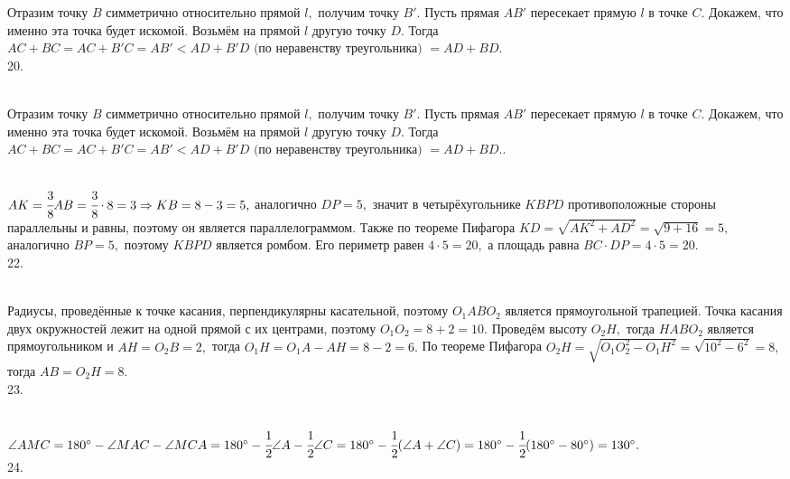 Отразим точку $B$ симметрично относительно прямой $l,$ получим точку $B'.$ Пусть прямая $AB'$ пересекает прямую $l$ в точке $C.$ Докажем, что именно эта точка будет искомой. Возьмём на прямой $l$ другую точку $D.$ Тогда $AC+BC=AC+B'C=AB'<AD+B'D\text{ (по неравенству треугольника) }=AD+BD.$\\
20. \begin{figure}[ht!]
\end{figure}\\
Отразим точку $B$ симметрично относительно прямой $l,$ получим точку $B'.$ Пусть прямая $AB'$ пересекает прямую $l$ в точке $C.$ Докажем, что именно эта точка будет искомой. Возьмём на прямой $l$ другую точку $D.$ Тогда $AC+BC=AC+B'C=AB'<AD+B'D\text{ (по неравенству треугольника) }=AD+BD.$\newpage{}. \begin{figure}[ht!]
\end{figure}\\
$AK=\cfrac{3}{8}AB=\cfrac{3}{8}\cdot8=3\Rightarrow KB=8-3=5,$ аналогично $DP=5,$ значит в четырёхугольнике $KBPD$ противоположные стороны параллельны и равны, поэтому он является параллелограммом. Также по теореме Пифагора $KD=\sqrt{AK^2+AD^2}=\sqrt{9+16}=5,$ аналогично $BP=5,$ поэтому $KBPD$ является ромбом. Его периметр равен $4\cdot5=20,$ а площадь равна $BC\cdot DP=4\cdot5=20.$\\
22. \begin{figure}[ht!]
\end{figure}\\
Радиусы, проведённые к точке касания, перпендикулярны касательной, поэтому $O_1ABO_2$ является прямоугольной трапецией. Точка касания двух окружностей лежит на одной прямой с их центрами, поэтому $O_1O_2=8+2=10.$ Проведём высоту $O_2H,$ тогда $HABO_2$ является прямоугольником и $AH=O_2B=2,$ тогда $O_1H=O_1A-AH=8-2=6.$ По теореме Пифагора $O_2H=\sqrt{O_1O_2^2-O_1H^2}=\sqrt{10^2-6^2}=8,$ тогда $AB=O_2H=8.$\\
23. \begin{figure}[ht!]
\end{figure}\\
$\angle AMC=180^\circ-\angle MAC-\angle MCA=180^\circ-\cfrac{1}{2}\angle A-\cfrac{1}{2}\angle C=180^\circ-\cfrac{1}{2}(\angle A+\angle C)=
180^\circ-\cfrac{1}{2}(180^\circ-80^\circ)=130^\circ.$\\
24. \begin{figure}[ht!]
\end{figure}\\
